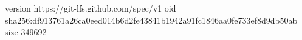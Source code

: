 version https://git-lfs.github.com/spec/v1
oid sha256:df913761a26ca0eed014b6d2fe43841b1942a91fc1846aa0fe733ef8d9db50ab
size 349692
